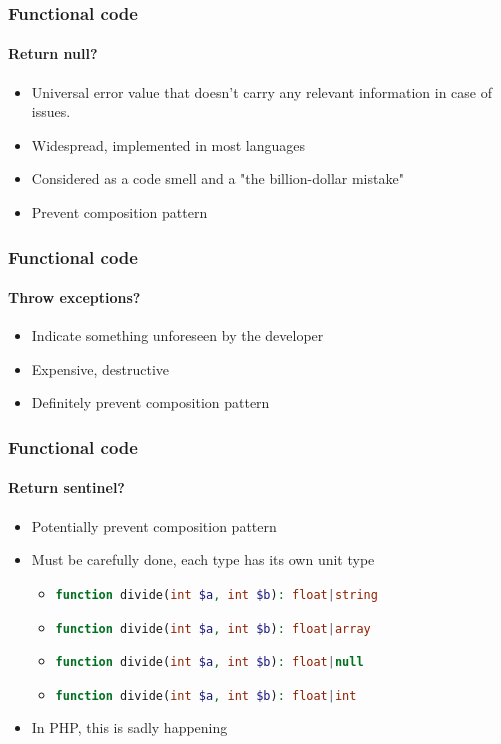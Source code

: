 \begin{frame}
  \frametitle{Functional code}
  \framesubtitle{Return null?}

  \begin{itemize}[<+->]
    \item Universal error value that doesn't carry any relevant information
          in case of issues.
    \item Widespread, implemented in most languages
    \item Considered as a code smell and a "the billion-dollar mistake"
    \item Prevent composition pattern
  \end{itemize}

\end{frame}

\begin{frame}
  \frametitle{Functional code}
  \framesubtitle{Throw exceptions?}

  \begin{itemize}[<+->]
    \item Indicate something unforeseen by the developer
    \item Expensive, destructive
    \item Definitely prevent composition pattern
  \end{itemize}

\end{frame}

\begin{frame}
  \frametitle{Functional code}
  \framesubtitle{Return sentinel?}

  \begin{itemize}[<+->]
    \item Potentially prevent composition pattern
    \item Must be carefully done, each type has its own unit type
          \begin{itemize}[<+->]
            \item \lstinline[language=PHP]!function divide(int $a, int $b): float|string!
            \item \lstinline[language=PHP]!function divide(int $a, int $b): float|array!
            \item \lstinline[language=PHP]!function divide(int $a, int $b): float|null!
            \item \lstinline[language=PHP]!function divide(int $a, int $b): float|int!
          \end{itemize}
    \item In PHP, this is sadly happening
  \end{itemize}

\end{frame}

